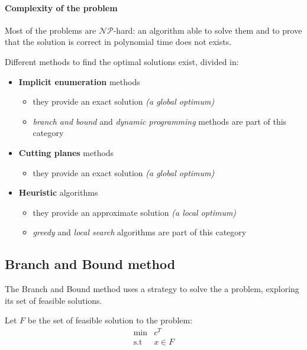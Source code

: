 \documentclass[english]{article}
\begin{document}
\paragraph{Complexity of the \ILP problem}

Most of the \ILP problems are \(\mathcal{NP}\)-hard:
an algorithm able to solve them and to prove that the solution is correct in polynomial time does not exists.

Different methods to find the optimal solutions exist, divided in:

\begin{itemize}
  \item \textbf{Implicit enumeration} methods
        \begin{itemize}
          \item[\cmarkthin] they provide an exact solution \textit{(a global optimum)}
          \item \textit{branch and bound} and \textit{dynamic programming} methods are part of this category
        \end{itemize}
  \item \textbf{Cutting planes} methods
        \begin{itemize}
          \item[\cmarkthin] they provide an exact solution \textit{(a global optimum)}
        \end{itemize}
  \item \textbf{Heuristic} algorithms
        \begin{itemize}
          \item[\xmarkthin] they provide an approximate solution \textit{(a local optimum)}
          \item \textit{greedy} and \textit{local search} algorithms are part of this category
        \end{itemize}
\end{itemize}

\subsection{Branch and Bound method}

The Branch and Bound method uses a  strategy to solve the a \ILP problem, exploring its set of feasible solutions.

Let \(F\) be the set of feasible solution to the problem:
\begin{align*}
  \min       & c^T     \\
  \text{s.t} & x \in F \\
\end{align*}
\end{document}
